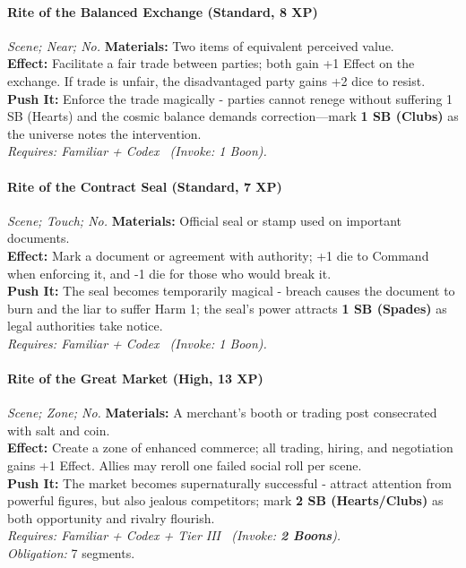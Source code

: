 \paragraph{Rite of the Balanced Exchange (Standard, 8 XP)} \emph{Scene; Near; No.}
\textbf{Materials:} Two items of equivalent perceived value. \\
\textbf{Effect:} Facilitate a fair trade between parties; both gain +1 Effect on the exchange. If trade is unfair, the disadvantaged party gains +2 dice to resist. \\
\textbf{Push It:} Enforce the trade magically - parties cannot renege without suffering 1 SB (Hearts) and the cosmic balance demands correction—mark \textbf{1 SB (Clubs)} as the universe notes the intervention. \\
\emph{Requires: Familiar + Codex \ (\textit{Invoke:} 1 Boon).}

\paragraph{Rite of the Contract Seal (Standard, 7 XP)} \emph{Scene; Touch; No.}
\textbf{Materials:} Official seal or stamp used on important documents. \\
\textbf{Effect:} Mark a document or agreement with authority; +1 die to Command when enforcing it, and -1 die for those who would break it. \\
\textbf{Push It:} The seal becomes temporarily magical - breach causes the document to burn and the liar to suffer Harm 1; the seal's power attracts \textbf{1 SB (Spades)} as legal authorities take notice. \\
\emph{Requires: Familiar + Codex \ (\textit{Invoke:} 1 Boon).}

\paragraph{Rite of the Great Market (High, 13 XP)} \emph{Scene; Zone; No.}
\textbf{Materials:} A merchant's booth or trading post consecrated with salt and coin. \\
\textbf{Effect:} Create a zone of enhanced commerce; all trading, hiring, and negotiation gains +1 Effect. Allies may reroll one failed social roll per scene. \\
\textbf{Push It:} The market becomes supernaturally successful - attract attention from powerful figures, but also jealous competitors; mark \textbf{2 SB (Hearts/Clubs)} as both opportunity and rivalry flourish. \\
\emph{Requires: Familiar + Codex + Tier III \ (\textit{Invoke:} \textbf{2 Boons}).} \\
\emph{Obligation:} 7 segments.

